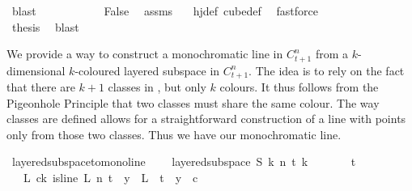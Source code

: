 \begin{isabellebody}
\ blast\isanewline
\ \ \ \ \ \ \ \ \isamarkupfalse%
\ \isamarkupfalse%
\ False\ \isamarkupfalse%
\ assms\ {}\ \isamarkupfalse%
\ hj{\isacharunderscore}{\kern0pt}def\ cube{\isacharunderscore}{\kern0pt}def\ \isamarkupfalse%
\ fastforce\isanewline
\ \ \ \ \ \ \ \ \isamarkupfalse%
\ \isamarkupfalse%
\ {\isacharquery}{\kern0pt}thesis\ \isamarkupfalse%
\ blast\isanewline
\ \ \ \ \ \ \isamarkupfalse%
\isanewline
\isanewline
\ \ \ \ \isamarkupfalse%
\isanewline
\ \ \isamarkupfalse%
\isanewline
{}\isamarkupfalse%
%
\endisatagproof
{\isafoldproof}%
%
\isadelimproof
%
\endisadelimproof
%
\isadelimdocument
%
\endisadelimdocument
%
\isatagdocument
%
\isamarkuptrue%
%
\endisatagdocument
{\isafolddocument}%
%
\isadelimdocument
%
\endisadelimdocument
%
\begin{isamarkuptext}%
We provide a way to construct a monochromatic line in $C^n_{t + 1}$ from a $k$-dimensional $k$-coloured
layered subspace  in $C^n_{t + 1}$.
The idea is to rely on the fact that there are $k+1$ classes in , but only $k$ colours. It thus follows
from the Pigeonhole Principle that two classes must share the same colour. The way classes are defined allows for a
straightforward construction of a line with points only from those two classes. Thus we have our monochromatic
line.%
\end{isamarkuptext}\isamarkuptrue%
\isamarkupfalse%
\ layered{\isacharunderscore}{\kern0pt}subspace{\isacharunderscore}{\kern0pt}to{\isacharunderscore}{\kern0pt}mono{\isacharunderscore}{\kern0pt}line{\isacharcolon}{\kern0pt}\ \isanewline
\ \ \ {\isachardoublequoteopen}layered{\isacharunderscore}{\kern0pt}subspace\ S\ k\ n\ t\ k\ {\isasymchi}{\isachardoublequoteclose}\ \isanewline
\ \ \ \ \ {\isachardoublequoteopen}t\ {\isachargreater}{\kern0pt}\ {}{\isachardoublequoteclose}\ \ \isanewline
\ \ \ {\isachardoublequoteopen}{\isacharparenleft}{\kern0pt}{\isasymexists}L{\isachardot}{\kern0pt}\ {\isasymexists}c{\isacharless}{\kern0pt}k{\isachardot}{\kern0pt}\ is{\isacharunderscore}{\kern0pt}line\ L\ n\ {\isacharparenleft}{\kern0pt}t{\isacharplus}{\kern0pt}{}{\isacharparenright}{\kern0pt}\ {\isasymand}\ {\isacharparenleft}{\kern0pt}{\isasymforall}y\ {\isasymin}\ L\ {\isacharbackquote}{\kern0pt}\ {\isacharbraceleft}{\kern0pt}{\isachardot}{\kern0pt}{\isachardot}{\kern0pt}{\isacharless}{\kern0pt}t{\isacharplus}{\kern0pt}{}{\isacharbraceright}{\kern0pt}{\isachardot}{\kern0pt}\ {\isasymchi}\ y\ {\isacharequal}{\kern0pt}\ c{\isacharparenright}{\kern0pt}{\isacharparenright}{\kern0pt}{\isachardoublequoteclose}\isanewline

\end{isabellebody}
